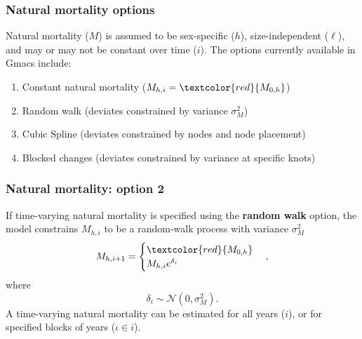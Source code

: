 \documentclass{beamer}
\begin{document}

\begin{frame}
\frametitle{Natural mortality options}
Natural mortality ($M$) is assumed to be sex-specific ($h$), size-independent
($\ell$), and may or may not be constant over time ($i$). The options currently
available in Gmacs include:
\begin{enumerate}
\item Constant natural mortality ($M_{h,i} = \textcolor{red}{M_{0,h}}$)
\item Random walk (deviates constrained by variance $\sigma^2_M$)
\item Cubic Spline (deviates constrained by nodes and node placement)
\item Blocked changes (deviates constrained by variance at specific knots)
\end{enumerate}
\end{frame}


\begin{frame}
\frametitle{Natural mortality: option 2}
If time-varying natural mortality is specified using the {\bf random walk}
option, the model constrains $M_{h,i}$ to be a random-walk process with variance
$\sigma^2_M$
\begin{equation*}
  M_{h,i+1} = 
  \begin{cases}
    \textcolor{red}{M_{0,h}} \\
    M_{h,i} e^{\delta_i}
  \end{cases},
\end{equation*}
where
\begin{equation*}
  \delta_i \sim \mathcal{N} \left( 0, \sigma^2_M \right).
\end{equation*}
A time-varying natural mortality can be estimated for all years ($i$), or for
specified blocks of years ($\iota \in i$).
\end{frame}

\end{document}
